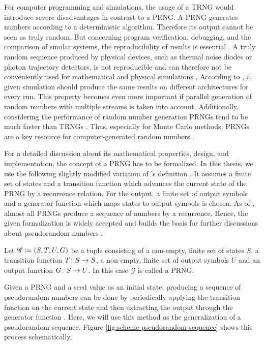 \documentclass{stdlocal}
\begin{document}
  For computer programming and simulations, the usage of a TRNG would introduce severe disadvantages in contrast to a PRNG.
  A PRNG generates numbers according to a deterministic algorithm.
  Therefore its output cannot be seen as truly random.
  But concerning program verification, debugging, and the comparison of similar systems, the reproducibility of results is essential \autocite{lecuyer2015}.
  A truly random sequence produced by physical devices, such as thermal noise diodes or photon trajectory detectors, is not reproducible and can therefore not be conveniently used for mathematical and physical simulations \autocite{lecuyer2015}.
  According to \textcite{lecuyer2015}, a given simulation should produce the same results on different architectures for every run.
  This property becomes even more important if parallel generation of random numbers with multiple streams is taken into account.
  Additionally, considering the performance of random number generation PRNGs tend to be much faster than TRNGs \autocite{intel-drng}.
  Thus, especially for Monte Carlo methods, PRNGs are a key resource for computer-generated random numbers \autocite{bauke2007}.

  For a detailed discussion about its mathematical properties, design, and implementation, the concept of a PRNG has to be formalized.
  In this thesis, we use the following slightly modified variation of \citeauthor{lecuyer1994}'s definition \autocite{lecuyer1994,lecuyer2015,barash2017,bauke2007}.
  It assumes a finite set of states and a transition function which advances the current state of the PRNG by a recurrence relation.
  For the output, a finite set of output symbols and a generator function which maps states to output symbols is chosen.
  As of \textcite{bauke2007}, almost all PRNGs produce a sequence of numbers by a recurrence.
  Hence, the given formalization is widely accepted and builds the basis for further discussions about pseudorandom numbers \autocite{lecuyer1994,lecuyer2015,barash2017,bauke2007}.

  \begin{definition}
    Let $\mathscr{G}\coloneqq (S,T,U,G)$ be a tuple consisting of a non-empty, finite set of states $S$, a transition function $T\colon S\to S$, a non-empty, finite set of output symbols $U$ and an output function $G\colon S\to U$.
    In this case $\mathscr{G}$ is called a PRNG.
  \end{definition}
  Given a PRNG and a seed value as an initial state, producing a sequence of pseudorandom numbers can be done by periodically applying the transition function on the current state and then extracting the output through the generator function \autocite{barash2017,lecuyer1994,lecuyer2015}.
  Here, we will use this method as the generalization of a pseudorandom sequence.
  Figure \ref{fig:scheme-pseudorandom-sequence} shows this process schematically.
\end{document}
